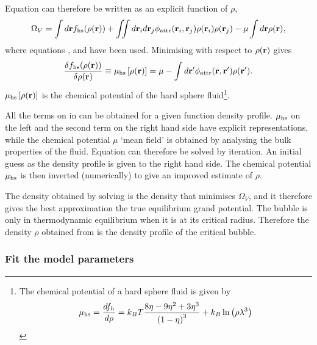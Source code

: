 Equation  can therefore be written as an explicit function of $\rho$,
\begin{align}
   \Omega_V = \int d\textbf{r} f_{\text{hs}}(\rho(\textbf{r}))  +   \iint d \textbf{r}_i d\textbf{r}_j \phi_{\text{attr}}( \textbf{r}_i, \textbf{r}_j) \rho(\textbf{r}_i)\rho(\textbf{r}_j) -  \mu \int d\textbf{r} \rho(\textbf{r}),  \label{eqn:OmegaV}
\end{align}
where equations ,  and  have been used.
Minimising  with respect to $\rho(\textbf{r})$ gives
\begin{align}
  \frac{\delta  f_{\text{hs}}(\rho(\textbf{r})) }{\delta \rho(\textbf{r})} \equiv \mu_{\text{hs}}\left[ \rho(\textbf{r}) \right] = \mu - \int d\textbf{r}^\prime \phi_{\text{attr}}( \textbf{r}, \textbf{r}^\prime) \rho(\textbf{r}^\prime). \label{eqn:ChemPots}
\end{align}
$\mu_{\text{hs}}\left[ \rho(\textbf{r}) \right]$ is the chemical potential of the hard sphere fluid\footnote{
The chemical potential of a hard sphere fluid is given by 
\begin{align}
 \mu_{\text{hs}} = \frac{d f_h}{d \rho} =  k_B T\frac{8\eta - 9 \eta^2 + 3\eta^3}{\left( 1-\eta \right)^3} + k_B \ln \left( \rho \lambda^3 \right)
\end{align}
}.

All the terms on in  can be obtained for a given function density profile.
$\mu_{\text{hs}}$ on the left and the second term on the right hand side have explicit representations, while
the chemical potential $\mu$ `mean field' is obtained by analysing the bulk properties of the fluid.
Equation  can therefore be solved by iteration.
An initial guess as the density profile is given to the right hand side.
The chemical potential $\mu_{\text{hs}}$ is then inverted (numerically) to give an improved estimate of $\rho$.

The density obtained by solving  is the density that minimises $\Omega_V$,
and it therefore gives the best approximation the true equilibrium grand potential.
The bubble is only in thermodynamic equilibrium when it is at its critical radius.
Therefore the density $\rho$ obtained from  is the density profile of the critical bubble.

\subsubsection{Fit the model parameters}\label{sec:nuc:DFT:fit}

